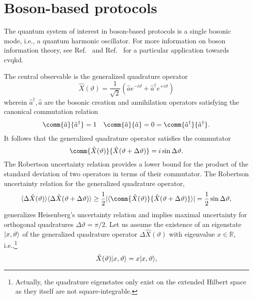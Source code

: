 \section{Boson-based protocols}

The quantum system of interest in boson-based protocols is a single bosonic mode, i.e., a quantum harmonic oscillator.
For more information on boson information theory, see Ref.~\cite{Weedbrook2012,Ferraro2005} and Ref.~\cite{Lodewyck2007,Diamanti2015} for a particular application towards \gls{cvqkd}.

The central observable is the generalized quadrature operator~\cite[p.~36]{Barnett2002}
\begin{equation}
	\hat{X}(\vartheta)
	=
	\frac{1}{\sqrt{2}}
	\left(
		\hat{a}
		e^{-i\vartheta}
		+
		\hat{a}^\dagger
		e^{+i\vartheta}
	\right)
\end{equation}
wherein $\hat{a}^\dagger,\hat{a}$ are the bosonic creation and annihilation operators satisfying the canonical commutation relation
\begin{align}
	\comm{\hat{a}}{\hat{a}^\dagger}
	=
	1
	&&
	\comm{\hat{a}}{\hat{a}}
	=
	0
	=
	\comm{\hat{a}^\dagger}{\hat{a}^\dagger}
	.
\end{align}
It follows that the generalized quadrature operator satisfies the commutator
\begin{equation}
	\comm{\hat{X}(\vartheta)}{\hat{X}(\vartheta+\Delta\vartheta)}
	=
	i\sin\Delta\vartheta
	.
\end{equation}
The Robertson uncertainty relation provides a lower bound for the product of the standard deviation of two operators in terms of their commutator.
The Robertson uncertainty relation for the generalized quadrature operator,
\begin{equation}
	\expval{\Delta\hat{X}(\vartheta)}
	\expval{\Delta\hat{X}(\vartheta+\Delta\vartheta)}
	\geq
	\frac{1}{2}
	\abs{\expval{\comm{\hat{X}(\vartheta)}{\hat{X}(\vartheta+\Delta\vartheta)}}}
	=
	\frac{1}{2}
	\sin\Delta\vartheta
	,
\end{equation}
generalizes Heisenberg's uncertainty relation and implies maximal uncertainty for orthogonal quadratures $\Delta\vartheta=\pi/2$.
Let us assume the existence of an eigenstate $\lvert x,\vartheta\rangle$ of the generalized quadrature operator $\Delta\hat{X}(\vartheta)$ with eigenvalue $x\in\mathbb{R}$, i.e.,\footnote{Actually, the quadrature eigenstates only exist on the extended Hilbert space as they itself are not square-integrable.}
\begin{equation}
	\hat{X}(\vartheta)
	\lvert x,\vartheta\rangle
	=
	x\lvert x,\vartheta\rangle
	,
\end{equation}
